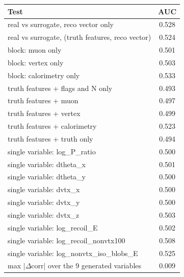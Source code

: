 \begin{tabular}{lc}
\toprule
Test & AUC \\
\midrule
real vs surrogate, reco vector only & 0.528 \\
real vs surrogate, (truth features, reco vector) & 0.524 \\
\midrule
block: muon only & 0.501 \\
block: vertex only & 0.503 \\
block: calorimetry only & 0.533 \\
truth features + flags and N only & 0.493 \\
truth features + muon & 0.497 \\
truth features + vertex & 0.499 \\
truth features + calorimetry & 0.523 \\
truth features + truth only & 0.494 \\
single variable: log\_P\_ratio & 0.500 \\
single variable: dtheta\_x & 0.501 \\
single variable: dtheta\_y & 0.500 \\
single variable: dvtx\_x & 0.500 \\
single variable: dvtx\_y & 0.500 \\
single variable: dvtx\_z & 0.503 \\
single variable: log\_recoil\_E & 0.502 \\
single variable: log\_recoil\_nonvtx100 & 0.508 \\
single variable: log\_nonvtx\_iso\_blobs\_E & 0.525 \\
\midrule
max $|\Delta$corr$|$ over the 9 generated variables & 0.009 \\
\bottomrule
\end{tabular}
